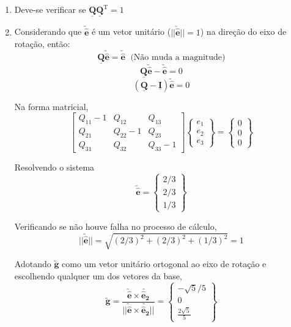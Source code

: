 \begin{enumerate}
    \item Deve-se verificar se $\underline{\mathbf{Q}}\underline{\mathbf{Q}}^{\text{T}}=1$
    \item Considerando que $\utilde{\mathbf{\hat{e}}}$ é um vetor unitário ($||\utilde{\mathbf{\hat{e}}}||=1$) na direção do eixo de rotação, então:
    	\[\underline{\mathbf{Q}}\utilde{\mathbf{\hat{e}}}=\utilde{\mathbf{\hat{e}}}\;\text{ (Não muda a magnitude)}\]
    	\[\underline{\mathbf{Q}}\utilde{\mathbf{\hat{e}}}-\utilde{\mathbf{\hat{e}}}=0\]
    	\[(\underline{\mathbf{Q}}-\underline{\mathbf{I}})\utilde{\mathbf{\hat{e}}}=0\]
    
    	Na forma matricial,
    	\[
     	   \begin{bmatrix}
    	        Q_{11}-1 & Q_{12} & Q_{13} \\
      	      Q_{21} & Q_{22}-1 & Q_{23} \\
     	       Q_{31} & Q_{32} & Q_{33}-1
     	   \end{bmatrix}
     	   \begin{Bmatrix}
     	       e_1 \\ e_2 \\ e_3
     	   \end{Bmatrix}
     	   =
     	   \begin{Bmatrix}
     	       0 \\ 0 \\ 0
     	   \end{Bmatrix}
    	\]
    
    	Resolvendo o sistema
    	\[
    	    \utilde{\mathbf{\hat{e}}}
    	    =
    	    \begin{Bmatrix}
    	        2/3 \\ 2/3 \\ 1/3
    	    \end{Bmatrix}
    	\]
    
    	Verificando se não houve falha no processo de cálculo,
    	\[||\utilde{\mathbf{\hat{e}}}||=\sqrt{(2/3)^2+(2/3)^2+(1/3)^2}=1\]
    
    	Adotando $\utilde{\mathbf{g}}$ como um vetor unitário ortogonal ao eixo de rotação e escolhendo qualquer um dos vetores da base,
    	\[
        	\utilde{\mathbf{g}}
        	=
        	\frac{\utilde{\mathbf{\hat{e}}}\times\utilde{\mathbf{\hat{e}_2}}}{||\utilde{\mathbf{\hat{e}}}\times\utilde{\mathbf{\hat{e}_2}}||}
        	=
        	\begin{Bmatrix}
        	    -\sqrt{5}/5 \\ 0 \\ \frac{2\sqrt{5}}{5}
        	\end{Bmatrix}
    	\]
    

\end{enumerate}
